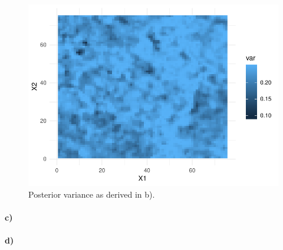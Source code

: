 \begin{figure}
    \centering
    \includegraphics{figures/b_var.pdf}
    \caption{Posterior variance as derived in b).}
    \label{fig:b_var}
\end{figure}

\paragraph{c)}


\paragraph{d)}

